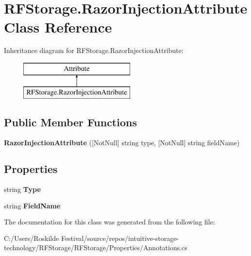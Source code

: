 \section{R\+F\+Storage.\+Razor\+Injection\+Attribute Class Reference}
\label{class_r_f_storage_1_1_razor_injection_attribute}
Inheritance diagram for R\+F\+Storage.\+Razor\+Injection\+Attribute\+:\begin{figure}[H]
\begin{center}
\leavevmode
\includegraphics[height=2.000000cm]{class_r_f_storage_1_1_razor_injection_attribute}
\end{center}
\end{figure}
\subsection*{Public Member Functions}
\begin{DoxyCompactItemize}
\item 
\mbox{\label{class_r_f_storage_1_1_razor_injection_attribute_aee2b8e12900faafdace6b338bee2b48f}} 
{\bfseries Razor\+Injection\+Attribute} ([Not\+Null] string type, [Not\+Null] string field\+Name)
\end{DoxyCompactItemize}
\subsection*{Properties}
\begin{DoxyCompactItemize}
\item 
\mbox{\label{class_r_f_storage_1_1_razor_injection_attribute_a67e71204c75aa7a01376ee3d1e2ae7bd}} 
string {\bfseries Type}\hspace{0.3cm}{\ttfamily  [get]}
\item 
\mbox{\label{class_r_f_storage_1_1_razor_injection_attribute_ae75f580869b944beceb7390a416f32d1}} 
string {\bfseries Field\+Name}\hspace{0.3cm}{\ttfamily  [get]}
\end{DoxyCompactItemize}


The documentation for this class was generated from the following file\+:\begin{DoxyCompactItemize}
\item 
C\+:/\+Users/\+Roskilde Festival/source/repos/intuitive-\/storage-\/technology/\+R\+F\+Storage/\+R\+F\+Storage/\+Properties/Annotations.\+cs\end{DoxyCompactItemize}

